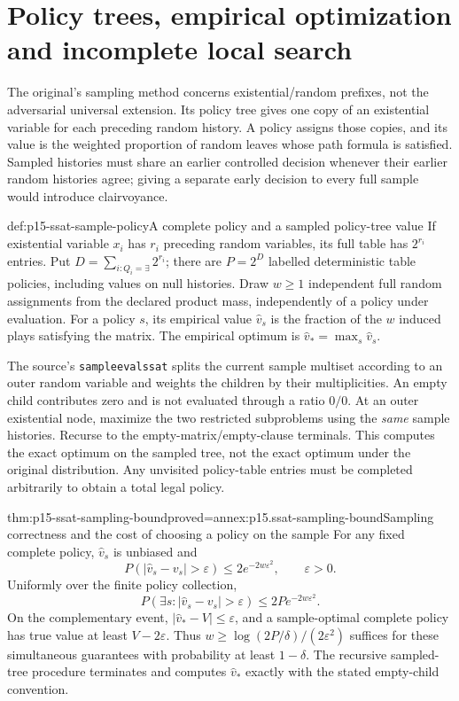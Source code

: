 \section{Policy trees, empirical optimization and incomplete local search}
\label{sec:p15-ssat-policy-sampling}

The original's sampling method concerns existential/random prefixes,
not the adversarial universal extension. Its policy tree gives one copy
of an existential variable for each preceding random history. A policy
assigns those copies, and its value is the weighted proportion of
random leaves whose path formula is satisfied. Sampled histories must
share an earlier controlled decision whenever their earlier random
histories agree; giving a separate early decision to every full sample
would introduce clairvoyance.

\begin{hbdefinition}{def:p15-ssat-sample-policy}{A complete policy and a sampled policy-tree value}
If existential variable \(x_i\) has \(r_i\) preceding random
variables, its full table has \(2^{r_i}\) entries. Put
\(D=\sum_{i:Q_i=\exists}2^{r_i}\); there are \(P=2^D\)
labelled deterministic table policies, including values on null histories.
Draw \(w\geq1\) independent full random assignments from the declared
product mass, independently of a policy under evaluation. For a policy
\(s\), its empirical value \(\widehat v_s\) is the fraction of
the \(w\) induced plays satisfying the matrix. The empirical optimum
is \(\widehat v_* = \max_s\widehat v_s\).

The source's \texttt{sampleevalssat} splits the current sample multiset
according to an outer random variable and weights the children by
their multiplicities. An empty child contributes zero and is not
evaluated through a ratio \(0/0\). At an outer existential node,
maximize the two restricted subproblems using the \emph{same} sample
histories. Recurse to the empty-matrix/empty-clause terminals. This
computes the exact optimum on the sampled tree, not the exact optimum
under the original distribution. Any unvisited policy-table entries
must be completed arbitrarily to obtain a total legal policy.
\end{hbdefinition}

\begin{hbtheorem}{thm:p15-ssat-sampling-bound}{proved=annex:p15.ssat-sampling-bound}{Sampling correctness and the cost of choosing a policy on the sample}
For any fixed complete policy, \(\widehat v_s\) is unbiased and
\[
 P(|\widehat v_s-v_s|>\varepsilon)
       \leq2e^{-2w\varepsilon^2},\qquad\varepsilon>0.
\]
Uniformly over the finite policy collection,
\[
 P(\exists s:|\widehat v_s-v_s|>\varepsilon)
       \leq2P e^{-2w\varepsilon^2}.
\]
On the complementary event,
\(|\widehat v_*-V|\leq\varepsilon\), and a sample-optimal complete
policy has true value at least \(V-2\varepsilon\).
Thus \(w\geq\log(2P/\delta)/(2\varepsilon^2)\) suffices for
these simultaneous guarantees with probability at least \(1-\delta\).
The recursive sampled-tree procedure terminates and computes
\(\widehat v_*\) exactly with the stated empty-child convention.
\end{hbtheorem}

